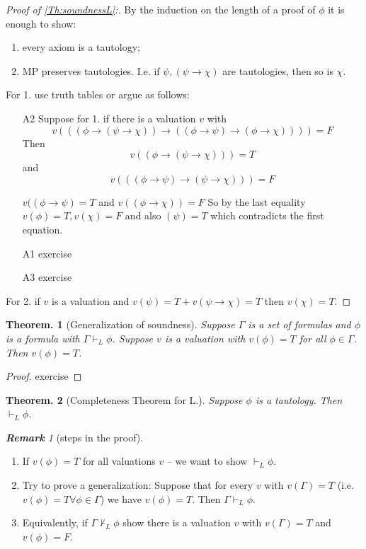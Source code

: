 \documentclass[a4paper,oneside,11pt,DIV=12,parskip=half]{scrartcl}
\theoremstyle{plain}
\newtheorem{theorem}{Theorem.}[section]
\theoremstyle{definition}
\newtheorem{remark, definition}[theorem]{Remark and Definition.}
\newtheorem{lemma, definition}[theorem]{Lemma and Definition.}
\newtheorem{theorem, definition}[theorem]{Theorem and Definition.}
\theoremstyle{remark}
\newtheorem*{remark}{\textbf{Remark}}
\newtheorem*{remark, example}{\textbf{Remark and Exercise}}
\begin{document}
\begin{proof}[Proof of \ref{Th:soundnessL}:] By the induction on the length of a proof of $\phi$ it is enough to show:
\begin{enumerate}
    \item every axiom is a tautology;
    \item MP preserves tautologies. I.e. if $\psi,(\psi \rightarrow \chi)$ are tautologies, then so is $\chi$.
\end{enumerate}
For 1. use truth tables or argue as follows:
\begin{itemize}
    \item [A2] Suppose for 1. if there is a valuation $v$ with \[ v(((\phi \rightarrow (\psi \rightarrow \chi)) \rightarrow ((\phi \rightarrow \psi) \rightarrow (\phi \rightarrow \chi)))) = F \]
    Then \[ v((\phi \rightarrow (\psi \rightarrow \chi))) = T \] and 
        \[ v(((\phi \rightarrow \psi) \rightarrow (\psi \rightarrow \chi))) = F \]
    
    $v((\phi \rightarrow \psi) = T$ and $v((\phi \rightarrow \chi)) = F$
    So by the last equality $v(\phi) = T, v(\chi) = F$ and also $(\psi) = T$ which contradicts the first equation.
    \item[A1] exercise
    \item[A3] exercise
\end{itemize}
For 2. if $v$ is a valuation and $v(\psi) = T + v(\psi \rightarrow \chi) = T$ then $v(\chi) = T$.

\end{proof}

\begin{theorem}[Generalization of soundness]

Suppose $\Gamma$ is a set of formulas and $\phi$ is a formula with $\Gamma \vdash_L \phi$. Suppose $v$ is a valuation with $v(\phi) = T$ for all $\phi \in \Gamma$. Then $v(\phi) = T$.
\end{theorem}
\begin{proof}
exercise
\end{proof}

\begin{theorem}[Completeness Theorem for L.]
Suppose $\phi$ is a tautology. Then $\vdash_L \phi$.

\end{theorem}

\begin{remark}[steps in the proof]
\begin{enumerate}
    \item 
 If $v(\phi) = T$ for all valuations $v$ -- we want to show $\vdash_L \phi$.
    \item Try to prove a generalization: Suppose that for every $v$ with $v(\Gamma) = T$ (i.e. $v(\phi) = T \forall \phi \in \Gamma$) we have $v(\phi) = T$. Then $\Gamma \vdash_L \phi$.
    \item Equivalently, if $\Gamma \not \vdash_L \phi$ show there is a valuation $v$ with $v(\Gamma) = T$ and $v(\phi) = F$.
\end{enumerate}
\end{remark}
\end{document}
